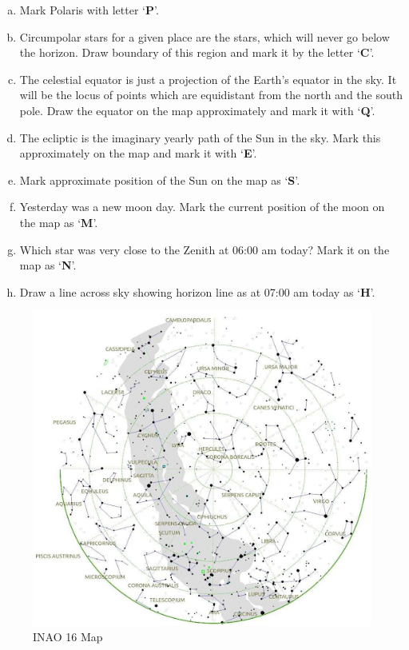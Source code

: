 \documentclass[a4paper,12pt]{extarticle}
\begin{document}
\begin{enumerate}[a.]
    \item Mark Polaris with letter ‘\textbf{P}’.
    \item Circumpolar stars for a given place are the stars, which will never go below the horizon. Draw boundary of this region and mark it by the letter ‘\textbf{C}’.
    \item The celestial equator is just a projection of the Earth’s equator in the sky. It will be the locus of points which are equidistant from the north and the south pole. Draw the equator on the map approximately and mark it with ‘\textbf{Q}’.
    \item The ecliptic is the imaginary yearly path of the Sun in the sky. Mark this approximately on the map and mark it with ‘\textbf{E}’.
    \item Mark approximate position of the Sun on the map as ‘\textbf{S}’.
    \item Yesterday was a new moon day. Mark the current position of the moon on the map as ‘\textbf{M}’.
    \item Which star was very close to the Zenith at 06:00 am today? Mark it on the map as ‘\textbf{N}’.
    \item Draw a line across sky showing horizon line as at 07:00 am today as ‘\textbf{H}’.
\end{enumerate}

\begin{figure}[H]
    \centering
    \includegraphics[width=0.9\linewidth]{INAI_16.png}
    \caption{INAO 16 Map}
    \label{INAO16}
\end{figure}
\end{document}
